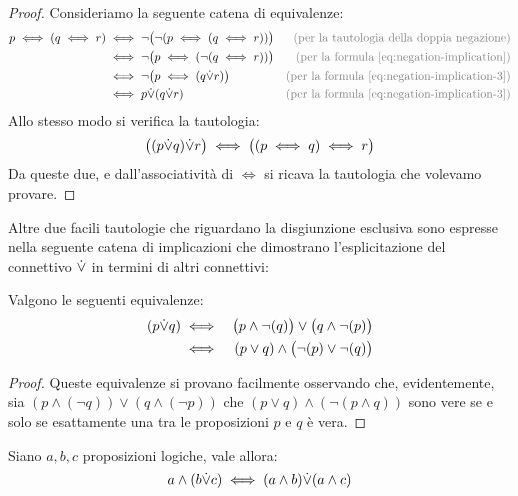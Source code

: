 \begin{proof}
	Consideriamo la seguente catena di equivalenze:
	\begin{align*}
		p \iff ( q \iff r) &\iff  \neg\bigl(\neg(p \iff (q \iff r))\bigr) & \textcolor{gray}{\text{(per la tautologia della doppia negazione)}} \\
		&\iff  \neg\bigl(p \iff (\neg(q \iff r))\bigr) & \textcolor{gray}{\text{(per la formula~\ref{eq:negation-implication})}}\\
		&\iff \neg\bigl(p \iff (q \xor r)\bigr) & \textcolor{gray}{\text{(per la formula~\ref{eq:negation-implication-3})}}\\
		&\iff  p \xor ( q \xor r) & \textcolor{gray}{\text{(per la formula~\ref{eq:negation-implication-3})}}\\
	\end{align*}
	Allo stesso modo si verifica la tautologia:
	\begin{equation}\label{eq:xor2}
		\bigl((p {\displaystyle{\dot{\vee}}} q){\displaystyle{\dot{\vee}}} r\bigr)\iff \bigl((p \iff q) \iff r\bigr)
	\end{equation}
	Da queste due, e dall'associatività di $\iff$ si ricava la tautologia che volevamo provare.
\end{proof}

Altre due facili tautologie che riguardano la disgiunzione esclusiva sono espresse nella seguente catena di implicazioni che dimostrano l'esplicitazione del connettivo ${\displaystyle{\dot{\vee}}}$ in termini di altri connettivi:

\begin{propbox}
	Valgono le seguenti equivalenze:
	\begin{eqnarray}
		(p {\displaystyle{\dot{\vee}}} q) &\iff& \bigl(p \land \neg(q)\bigr) \lor \bigl(q \land \neg(p)\bigr) \label{eq:exclusive-or-1}\\
		&\iff& (p \lor q) \land \bigl(\neg(p) \lor \neg(q)\bigr) \label{eq:exclusive-or-2}
	\end{eqnarray}
\end{propbox}
\begin{proof}
	Queste equivalenze si provano facilmente osservando che, evidentemente, sia
	$(p \land( \neg q)) \lor (q \land (\neg p))$ che $(p \lor q) \land ( \neg(p \land q))$ sono vere se e solo se esattamente una tra le proposizioni $p$ e $q$ è vera.
\end{proof}

\begin{propbox}
	Siano $a,b,c$ proposizioni logiche, vale allora:
	\begin{equation}\label{eq:distributività_congiunzione_xor}
		a \land (b {\displaystyle{\dot{\vee}}} c) \iff (a \land b) {\displaystyle{\dot{\vee}}} (a \land c)
	\end{equation}
\end{propbox}

